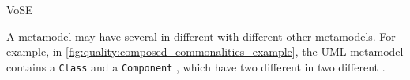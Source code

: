 \begin{copiedFrom}{VoSE}
%
%

A metamodel may have several \commonalities in different \conceptmetamodels with different other metamodels.
For example, in \autoref{fig:quality:composed_commonalities_example}, the UML metamodel contains a \texttt{Class} and a \texttt{Component} \metaclass, which have two different \commonalities in two different \conceptmetamodels.


\end{copiedFrom}
